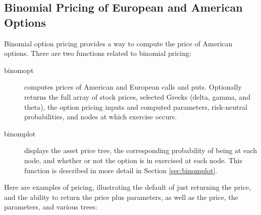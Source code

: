 \documentclass{article}\usepackage[]{graphicx}\usepackage[]{color}
\begin{document}
\subsection{Binomial Pricing of European and American Options}

Binomial option pricing provides a way to compute the price of
American options.  There are two functions related to binomial
pricing: 
\begin{description}
\item[binomopt] computes prices of American and European calls and
  puts. Optionally returns the full array of stock prices, selected
  Greeks (delta, gamma, and theta), the option pricing inputs and
  computed parameters, risk-neutral probabilities, and nodes at which
  exercise occurs.
\item[binomplot] displays the asset price
  tree, the corresponding probability of being at each node, and
  whether or not the option is in exercised at each node. This
  function is described in more detail in Section \ref{sec:binomplot}.
\end{description}

Here are examples of pricing, illustrating the default of just
returning the price, and the ability to return the price plus
parameters, as well as the price, the parameters, and various trees:
\end{document}
